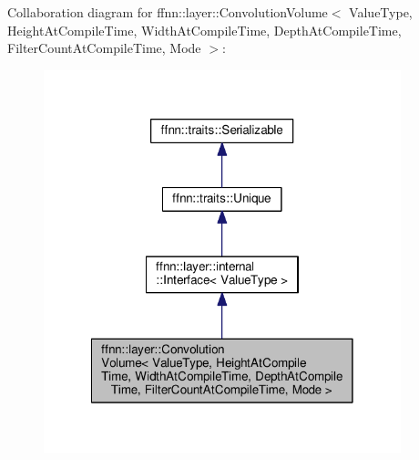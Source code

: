 Collaboration diagram for ffnn\-:\-:layer\-:\-:Convolution\-Volume$<$ Value\-Type, Height\-At\-Compile\-Time, Width\-At\-Compile\-Time, Depth\-At\-Compile\-Time, Filter\-Count\-At\-Compile\-Time, Mode $>$\-:\nopagebreak
\begin{figure}[H]
\begin{center}
\leavevmode
\includegraphics[width=294pt]{classffnn_1_1layer_1_1_convolution_volume__coll__graph}
\end{center}
\end{figure}
